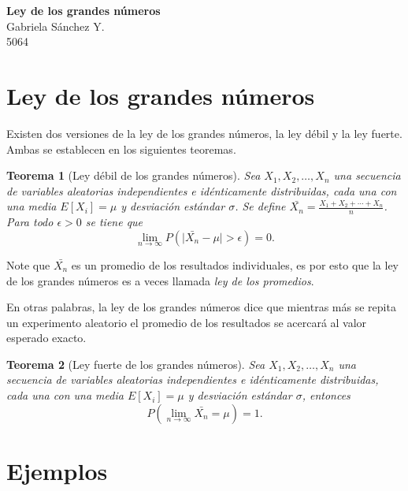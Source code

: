 \documentclass[12pt]{article}
\newtheorem{theorem}{Teorema}
\begin{document}
	\thispagestyle{empty}

	\begin{center}
		{\Large \bf Ley de los grandes números}\\
		Gabriela S\'anchez Y.\\
		5064
	\end{center}
  
  	\section{Ley de los grandes números}
  	
	Existen dos versiones de la ley de los grandes números, la ley débil y la ley fuerte. Ambas se establecen en los siguientes teoremas.
	
	\begin{theorem}[Ley débil de los grandes números]
		Sea $X_1, X_2, \ldots, X_n$ una secuencia de variables aleatorias independientes e idénticamente distribuidas, cada una con una media $E[X_i] = \mu$ y desviación estándar $\sigma$. Se define $\bar{X_n} = \frac{X_1 + X_2 + \cdots + X_n}{n}$. Para todo $\epsilon > 0$ se tiene que 
		\begin{equation*}
		\lim_{n \rightarrow \infty} P(\mid \bar{X_n} - \mu| > \epsilon) = 0.
		\end{equation*}
	\end{theorem}

	Note que $\bar{X_n}$ es un promedio de los resultados individuales, es por esto que la ley de los grandes números es a veces llamada {\em ley de los promedios}.
	
	En otras palabras, la ley de los grandes números dice que mientras más se repita un experimento aleatorio el promedio de los resultados se acercará al valor esperado exacto.

	\begin{theorem}[Ley fuerte de los grandes números]
		Sea $X_1, X_2, \ldots, X_n$ una secuencia de variables aleatorias independientes e idénticamente distribuidas, cada una con una media $E[X_i] = \mu$ y desviación estándar $\sigma$, entonces
		\begin{equation*}
		P(\lim_{n \rightarrow \infty} \bar{X_n} = \mu) = 1.
		\end{equation*}
	\end{theorem}

	\section{Ejemplos}
\end{document}
